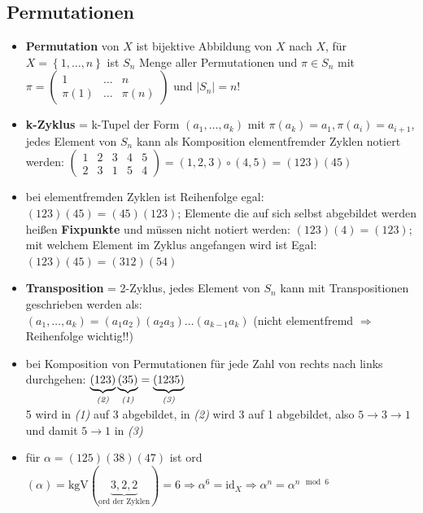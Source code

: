 \documentclass[10pt,a4paper]{article}
\begin{document}
\subsection{Permutationen}
\begin{itemize}
\item \textbf{Permutation} von $X$ ist bijektive Abbildung von $X$ nach $X$, für $X=\left\lbrace 1,\dotsc, n\right\rbrace$ ist $S_{n}$ Menge aller Permutationen und $\pi \in S_{n}$ mit $\pi=\begin{pmatrix}1&\dotsc& n\\ \pi(1)&\dotsc &\pi(n)\end{pmatrix} $ und $\vert S_{n}\vert =n!$
\item \textbf{k-Zyklus} = k-Tupel der Form $(a_{1},\dotsc,a_{k})$ mit $\pi(a_{k})=a_{1}, \pi(a_{i})=a_{i+1}$, jedes Element von $S_{n}$ kann als Komposition elementfremder Zyklen notiert werden: $\begin{pmatrix}1&2& 3&4&5\\ 2&3&1&5&4\end{pmatrix}=(1,2,3)\circ (4,5)=(123)(45)$
\item bei elementfremden Zyklen ist Reihenfolge egal: $(123)(45)=(45)(123)$; Elemente die auf sich selbst abgebildet werden heißen \textbf{Fixpunkte} und müssen nicht notiert werden: $(123)(4)=(123)$; mit welchem Element im Zyklus angefangen wird ist Egal: $(123)(45)=(312)(54)$ 
\item \textbf{Transposition} = 2-Zyklus, jedes Element von $S_{n}$ kann mit Transpositionen geschrieben werden als:\\ $(a_{1},\dotsc, a_{k})=(a_{1}a_{2})(a_{2}a_{3})\dotsc(a_{k-1}a_{k})$ (nicht elementfremd $\Rightarrow$ Reihenfolge wichtig!!)
\item bei Komposition von Permutationen für jede Zahl von rechts nach links durchgehen: $\underbrace{(123)}_{\text{\textit{(2)}}}\underbrace{(35)}_{\text{\textit{(1)}}}=\underbrace{(1235)}_{\text{\textit{(3)}}}$\\5 wird in \textit{(1)} auf 3 abgebildet, in \textit{(2)} wird 3 auf 1 abgebildet, also $5\rightarrow 3 \rightarrow 1$ und damit $5\rightarrow 1$  in \textit{(3)} 
\item für $\alpha=(125)(38)(47)$ ist ord$(\alpha)=\text{kgV}(\underbrace{3,2,2}_{\text{ord der Zyklen}})=6\Rightarrow \alpha^{6}=\text{id}_{X} \Rightarrow \alpha^{n}=\alpha^{n \mod 6}$
\end{itemize}
\end{document}
